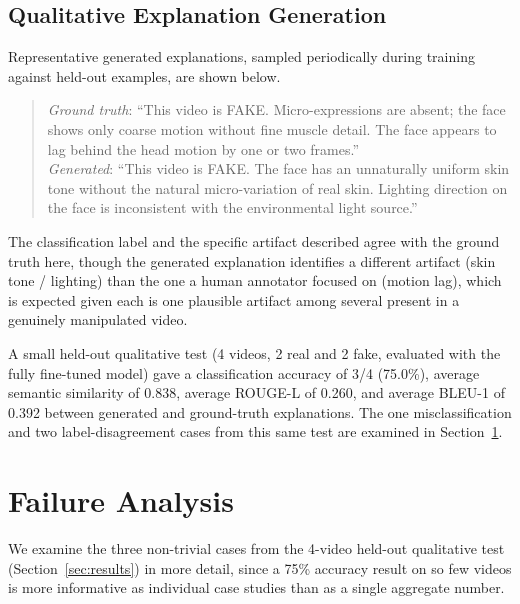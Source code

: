 \documentclass[acmsmall,review=false]{acmart}
\begin{document}
\subsection{Qualitative Explanation Generation}

Representative generated explanations, sampled periodically during training
against held-out examples, are shown below.

\begin{quote}
\textit{Ground truth}: ``This video is FAKE. Micro-expressions are absent; the
face shows only coarse motion without fine muscle detail. The face appears to
lag behind the head motion by one or two frames.''\\
\textit{Generated}: ``This video is FAKE. The face has an unnaturally uniform
skin tone without the natural micro-variation of real skin. Lighting direction
on the face is inconsistent with the environmental light source.''
\end{quote}

The classification label and the specific artifact described agree with the
ground truth here, though the generated explanation identifies a different
artifact (skin tone / lighting) than the one a human annotator focused on
(motion lag), which is expected given each is one plausible artifact among
several present in a genuinely manipulated video.

A small held-out qualitative test (4 videos, 2 real and 2 fake, evaluated with
the fully fine-tuned model) gave a classification accuracy of 3/4 (75.0\%),
average semantic similarity of 0.838, average ROUGE-L of 0.260, and average
BLEU-1 of 0.392 between generated and ground-truth explanations. The one
misclassification and two label-disagreement cases from this same test are
examined in Section~\ref{sec:failure}.

\section{Failure Analysis}
\label{sec:failure}

We examine the three non-trivial cases from the 4-video held-out qualitative
test (Section~\ref{sec:results}) in more detail, since a 75\% accuracy result
on so few videos is more informative as individual case studies than as a
single aggregate number.
\end{document}
